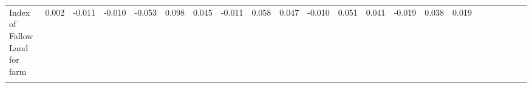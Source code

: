 \begin{tabular}{lccccccccccccccccccccc}
\noalign{\smallskip}Index of Fallow Land for farm & 0.002 & -0.011 & -0.010 & -0.053 & 0.098 & 0.045 & -0.011 & 0.058 & 0.047 & -0.010 & 0.051 & 0.041 & -0.019 & 0.038 & 0.019 &  &  &  &  &  & \\
 & \begin{footnotesize}[0.053]\end{footnotesize} & \begin{footnotesize}[0.068]\end{footnotesize} & \begin{footnotesize}[0.057]\end{footnotesize} & \begin{footnotesize}[0.056]\end{footnotesize} & \begin{footnotesize}[0.066]\end{footnotesize} & \begin{footnotesize}[0.053]\end{footnotesize} & \begin{footnotesize}[0.047]\end{footnotesize} & \begin{footnotesize}[0.104]\end{footnotesize} & \begin{footnotesize}[0.097]\end{footnotesize} & \begin{footnotesize}[0.047]\end{footnotesize} & \begin{footnotesize}[0.104]\end{footnotesize} & \begin{footnotesize}[0.096]\end{footnotesize} & \begin{footnotesize}[0.103]\end{footnotesize} & \begin{footnotesize}[0.218]\end{footnotesize} & \begin{footnotesize}[0.131]\end{footnotesize} & \begin{footnotesize}\end{footnotesize} & \begin{footnotesize}\end{footnotesize} & \begin{footnotesize}\end{footnotesize} & \begin{footnotesize}\end{footnotesize} & \begin{footnotesize}\end{footnotesize} & \begin{footnotesize}\end{footnotesize}\\

\end{tabular}
